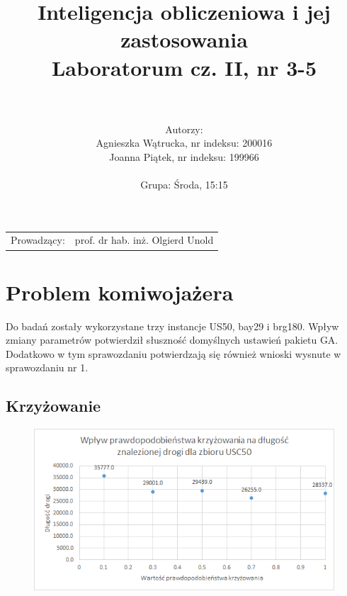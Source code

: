 \documentclass{article}
\title{Inteligencja obliczeniowa i jej zastosowania\\
	\vspace{5mm}
	\textbf{Laboratorum cz. II, nr 3-5}} %
\author{\\
	\\Autorzy:
	\\Agnieszka Wątrucka, nr indeksu: 200016
	\\Joanna Piątek, nr indeksu: 199966
	\\
	\\Grupa: Środa, 15:15} %
\begin{document}
\maketitle %

\begin{center}
\begin{tabular}{l r}
Prowadzący: & prof. dr hab. inż. Olgierd Unold %
\end{tabular}
\end{center}
 
\newpage
\newpage

\chapter{Problem komiwojażera}

Do badań zostały wykorzystane trzy instancje US50, bay29 i brg180. Wpływ zmiany parametrów potwierdził słuszność domyślnych ustawień pakietu GA. Dodatkowo w tym sprawozdaniu potwierdzają się również wnioski wysnute w sprawozdaniu nr 1.




\section{Krzyżowanie}


\begin{figure}[H]
\centering

\includegraphics[scale=0.9]{IO_obrazy/excel_usca_kros}
\end{figure}
\end{document}
